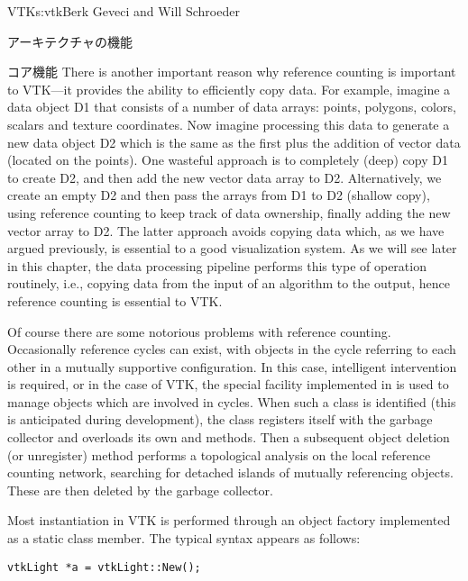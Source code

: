 \begin{aosachapter}{VTK}{s:vtk}{Berk Geveci and Will Schroeder}
\begin{aosasect1}{アーキテクチャの機能}
\begin{aosasect2}{コア機能}
There is another important reason why reference counting is important
to VTK---it provides the ability to efficiently copy data. For
example, imagine a data object D1 that consists of a number of data
arrays: points, polygons, colors, scalars and texture coordinates. Now
imagine processing this data to generate a new data object D2 which is
the same as the first plus the addition of vector data (located on the
points). One wasteful approach is to completely (deep) copy D1 to
create D2, and then add the new vector data array to
D2. Alternatively, we create an empty D2 and then pass the arrays from
D1 to D2 (shallow copy), using reference counting to keep track of
data ownership, finally adding the new vector array to D2. The latter
approach avoids copying data which, as we have argued previously, is
essential to a good visualization system. As we will see later in this
chapter, the data processing pipeline performs this type of operation
routinely, i.e., copying data from the input of an algorithm to the
output, hence reference counting is essential to VTK.

Of course there are some notorious problems with reference
counting. Occasionally reference cycles can exist, with objects in the
cycle referring to each other in a mutually supportive
configuration. In this case, intelligent intervention is required, or
in the case of VTK, the special facility implemented in
 is used to manage objects which are
involved in cycles. When such a class is identified (this is
anticipated during development), the class registers itself with the
garbage collector and overloads its own  and
 methods. Then a subsequent object deletion (or
unregister) method performs a topological analysis on the local
reference counting network, searching for detached islands of mutually
referencing objects. These are then deleted by the garbage collector.

Most instantiation in VTK is performed through an object factory
implemented as a static class member. The typical syntax appears as
follows:

\begin{verbatim}
vtkLight *a = vtkLight::New();
\end{verbatim}


\end{aosasect2}
\end{aosasect1}
\end{aosachapter}
